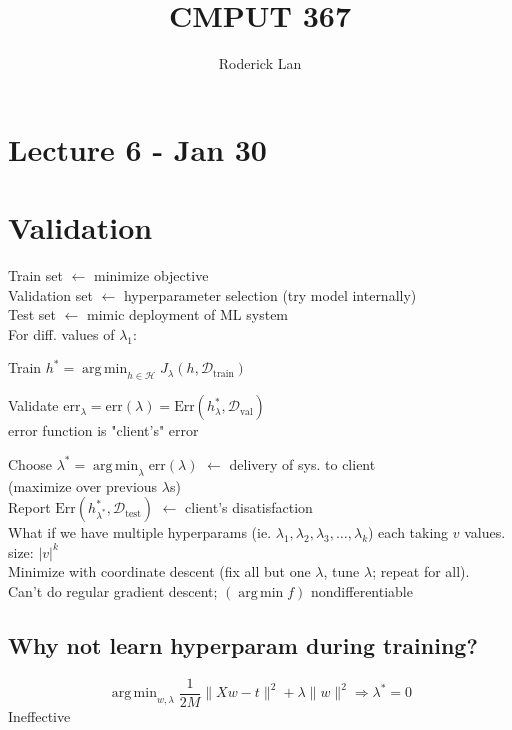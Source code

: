 \documentclass{article}
\title{CMPUT 367}
\author{Roderick Lan}
\date{}
\DeclareMathOperator*{\argmin}{arg\,min}
\begin{document}
\maketitle

\tableofcontents
\break

\section*{Lecture 6 - Jan 30}
\section{Validation}
Train set $\gets$ minimize objective
\\
Validation set $\gets$ hyperparameter selection (try model internally)
\\
Test set $\gets$ mimic deployment of ML system
\\[5pt]
For diff. values of $\lambda_1$:
\begin{list}{}{}
    \item Train $h^* = \argmin_{h\in \mathcal H} J_\lambda (h, \mathcal D_{\mathrm{train}})$
    \item Validate $\mathrm{err}_\lambda =\mathrm{err}(\lambda) = \mathrm{Err}(h^*_\lambda , \mathcal D_{\mathrm{val}})$ 
    \\error function is "client's" error
\end{list}
Choose $\lambda^* = \argmin_{\lambda} \mathrm{err}(\lambda)$ $\gets$ delivery of sys. to client\\
(maximize over previous $\lambda$s)\\[5pt]
Report $\mathrm{Err} (h_{\lambda^*}^*, \mathcal D_{\mathrm{test}})$ $\gets$ client's disatisfaction
\\[10pt]
What if we have multiple hyperparams (ie. $\lambda_1, \lambda_2, \lambda_3, \ldots, \lambda_k$) each taking
$v$ values. \\
size: $|v|^k$\\
Minimize with coordinate descent (fix all but one $\lambda$, tune $\lambda$; repeat for all).\\
Can't do regular gradient descent; $(\argmin f)$ nondifferentiable
\subsection{Why not learn hyperparam during training?}
\[
    \argmin_{w,\lambda} \frac{1}{2M} \| Xw - t\|^2 + \lambda \| w\| ^2 \Rightarrow \lambda^* = 0
\]
Ineffective 
\end{document}
